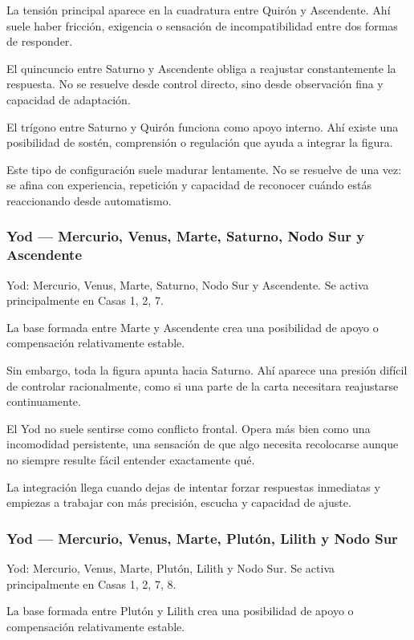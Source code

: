 \documentclass[11pt,a4paper]{article}
\begin{document}
La tensión principal aparece en la cuadratura entre Quirón y Ascendente. Ahí suele haber fricción, exigencia o sensación de incompatibilidad entre dos formas de responder.

El quincuncio entre Saturno y Ascendente obliga a reajustar constantemente la respuesta. No se resuelve desde control directo, sino desde observación fina y capacidad de adaptación.

El trígono entre Saturno y Quirón funciona como apoyo interno. Ahí existe una posibilidad de sostén, comprensión o regulación que ayuda a integrar la figura.

Este tipo de configuración suele madurar lentamente. No se resuelve de una vez: se afina con experiencia, repetición y capacidad de reconocer cuándo estás reaccionando desde automatismo.

\subsubsection*{Yod — Mercurio, Venus, Marte, Saturno, Nodo Sur y Ascendente}
Yod: Mercurio, Venus, Marte, Saturno, Nodo Sur y Ascendente. Se activa principalmente en Casas 1, 2, 7.

La base formada entre Marte y Ascendente crea una posibilidad de apoyo o compensación relativamente estable.

Sin embargo, toda la figura apunta hacia Saturno. Ahí aparece una presión difícil de controlar racionalmente, como si una parte de la carta necesitara reajustarse continuamente.

El Yod no suele sentirse como conflicto frontal. Opera más bien como una incomodidad persistente, una sensación de que algo necesita recolocarse aunque no siempre resulte fácil entender exactamente qué.

La integración llega cuando dejas de intentar forzar respuestas inmediatas y empiezas a trabajar con más precisión, escucha y capacidad de ajuste.

\subsubsection*{Yod — Mercurio, Venus, Marte, Plutón, Lilith y Nodo Sur}
Yod: Mercurio, Venus, Marte, Plutón, Lilith y Nodo Sur. Se activa principalmente en Casas 1, 2, 7, 8.

La base formada entre Plutón y Lilith crea una posibilidad de apoyo o compensación relativamente estable.
\end{document}
